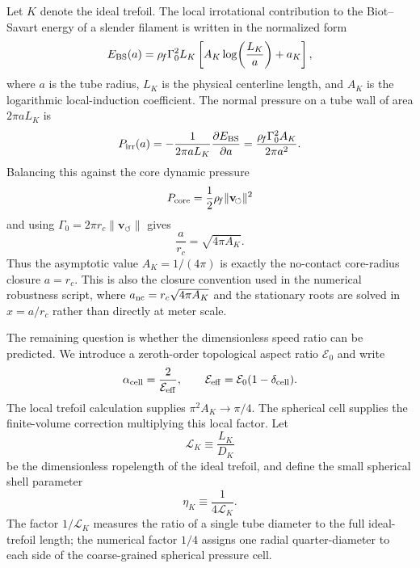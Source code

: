 \documentclass[aps,pra,preprint,longbibliography,nofootinbib]{revtex4-2}
\newcommand{\vnorm}{\lVert\mathbf{v}_{\!\boldsymbol{\circlearrowleft}}\rVert} %
\newcommand{\rhof}{\rho_{\!f}}                   %
\newcommand{\Gz}{\Gamma_0}                       %
\newcommand{\Et}{\mathcal{E}_0}                    %
\newcommand{\LK}{\mathcal{L}_K}                     %
\newcommand{\AK}{A_K}                                %
\begin{document}
Let $K$ denote the ideal trefoil.  The local irrotational contribution to
the Biot--Savart energy of a slender filament is written in the normalized
form
\begin{equation}
  E_{\rm BS}(a)
  = \rhof \Gz^2 L_K
    \left[\AK\log\!\left(\frac{L_K}{a}\right)+a_K\right],
  \label{eq:bs_log_energy}
\end{equation}
where $a$ is the tube radius, $L_K$ is the physical centerline length, and
$\AK$ is the logarithmic local-induction coefficient.  The normal pressure
on a tube wall of area $2\pi aL_K$ is
\begin{equation}
  P_{\rm irr}(a)
  = -\frac{1}{2\pi aL_K}\frac{\partial E_{\rm BS}}{\partial a}
  = \frac{\rhof\Gz^2\AK}{2\pi a^2}.
  \label{eq:pirr_from_bs}
\end{equation}
Balancing this against the core dynamic pressure
\begin{equation}
  P_{\rm core}=\frac{1}{2}\rhof\vnorm^2
  \label{eq:pcore_dynamic}
\end{equation}
and using $\Gz=2\pi r_c\vnorm$ gives
\begin{equation}
  \frac{a}{r_c}=\sqrt{4\pi\AK}.
  \label{eq:anc_from_AK}
\end{equation}
Thus the asymptotic value $\AK=1/(4\pi)$ is exactly the no-contact
core-radius closure $a=r_c$.  This is also the closure convention used in
the numerical robustness script, where $a_{\rm nc}=r_c\sqrt{4\pi A_K}$ and
the stationary roots are solved in $x=a/r_c$ rather than directly at
meter scale.

The remaining question is whether the dimensionless speed ratio can be
predicted.  We introduce a zeroth-order topological aspect ratio $\Et$ and
write
\begin{equation}
  \alpha_{\rm cell}=\frac{2}{\mathcal E_{\rm eff}},
  \qquad
  \mathcal E_{\rm eff}=\Et(1-\delta_{\rm cell}).
  \label{eq:alpha_cell_def}
\end{equation}
The local trefoil calculation supplies $\pi^2\AK\to\pi/4$.  The spherical
cell supplies the finite-volume correction multiplying this local factor.
Let
\begin{equation}
  \LK\equiv \frac{L_K}{D_K}
  \label{eq:ropelength_def}
\end{equation}
be the dimensionless ropelength of the ideal trefoil, and define the
small spherical shell parameter
\begin{equation}
  \eta_K\equiv\frac{1}{4\LK}.
  \label{eq:etaK_def}
\end{equation}
The factor $1/\LK$ measures the ratio of a single tube diameter to the
full ideal-trefoil length; the numerical factor $1/4$ assigns one radial
quarter-diameter to each side of the coarse-grained spherical pressure
cell.
\end{document}

